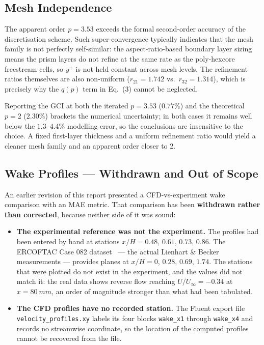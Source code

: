 \documentclass[12pt,a4paper]{article}
\begin{document}
\subsection{Mesh Independence}
\label{sec:mesh_disc}
The apparent order $p = 3.53$ exceeds the formal second-order accuracy of the discretisation
scheme. Such super-convergence typically indicates that the mesh family is not perfectly
self-similar: the aspect-ratio-based boundary layer sizing means the prism layers do not refine at
the same rate as the poly-hexcore freestream cells, so $y^+$ is not held constant across mesh
levels. The refinement ratios themselves are also non-uniform ($r_{21}=1.742$ vs.\ $r_{32}=1.314$),
which is precisely why the $q(p)$ term in Eq.~(3) cannot be neglected.

Reporting the GCI at both the iterated $p = 3.53$ ($0.77\%$) and the theoretical $p = 2$ ($2.30\%$)
brackets the numerical uncertainty; in both cases it remains well below the $1.3$–$4.4\%$ modelling
error, so the conclusions are insensitive to the choice. A fixed first-layer thickness and a
uniform refinement ratio would yield a cleaner mesh family and an apparent order closer to 2.

\subsection{Wake Profiles — Withdrawn and Out of Scope}
\label{sec:wake_disc}

An earlier revision of this report presented a CFD-vs-experiment wake comparison with an MAE metric.
That comparison has been \textbf{withdrawn rather than corrected}, because neither side of it was
sound:

\begin{sloppypar}
\begin{itemize}
  \item \textbf{The experimental reference was not the experiment.} The profiles had been entered
  by hand at stations $x/H = 0.48$, $0.61$, $0.73$, $0.86$. The ERCOFTAC Case 082
  dataset~\cite{ercoftac082} — the actual Lienhart \& Becker measurements — provides planes at
  $x/H = 0$, $0.28$, $0.69$, $1.74$. The stations that were plotted do not exist in the experiment,
  and the values did not match it: the real data shows reverse flow reaching $U/U_\infty = -0.34$ at
  $x = \SI{80}{mm}$, an order of magnitude stronger than what had been tabulated.
  \item \textbf{The CFD profiles have no recorded station.} The Fluent export file
  \texttt{velocity\_profiles.xy} labels its four blocks \texttt{wake\_x1} through
  \texttt{wake\_x4} and records no streamwise coordinate, so the location of the computed profiles
  cannot be recovered from the file.
\end{itemize}
\end{sloppypar}
\end{document}
